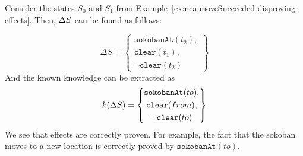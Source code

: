 \documentclass[../Master.tex]{subfiles}
\begin{document}
\begin{example} \label{ex:nca:moveSucceeded-proving-effects}
	Consider the states $S_0$ and $S_1$ from Example~\ref{ex:nca:moveSucceeded-disproving-effects}. Then, $\Delta S$ can be found as follows:
	
	\begin{equation*}
	\Delta S = \left\{
        \begin{gathered}
            \texttt{sokobanAt}(t_2), \\
            \texttt{clear}(t_1), \\
            \neg \texttt{clear}(t_2)		
        \end{gathered}
        \right\}
	\end{equation*}
And the known knowledge can be extracted as
    \begin{equation*}
        k(\Delta S) = \left\{
            \begin{gathered}
                \texttt{sokobanAt}(to), \\
                \texttt{clear}(from), \\
                \neg \texttt{clear}(to)		
            \end{gathered}
        \right\}
    \end{equation*}
	We see that effects are correctly proven. For example, the fact that the sokoban moves to a new location is correctly proved by $\texttt{sokobanAt}(to)$.
\end{example}
\end{document}
